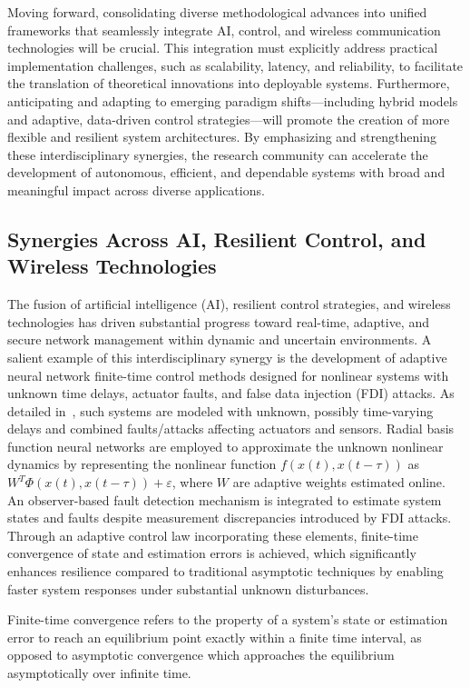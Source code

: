 \documentclass[sigconf]{acmart}
\begin{document}
Moving forward, consolidating diverse methodological advances into unified frameworks that seamlessly integrate AI, control, and wireless communication technologies will be crucial. This integration must explicitly address practical implementation challenges, such as scalability, latency, and reliability, to facilitate the translation of theoretical innovations into deployable systems. Furthermore, anticipating and adapting to emerging paradigm shifts—including hybrid models and adaptive, data-driven control strategies—will promote the creation of more flexible and resilient system architectures. By emphasizing and strengthening these interdisciplinary synergies, the research community can accelerate the development of autonomous, efficient, and dependable systems with broad and meaningful impact across diverse applications.

\subsection{Synergies Across AI, Resilient Control, and Wireless Technologies}

The fusion of artificial intelligence (AI), resilient control strategies, and wireless technologies has driven substantial progress toward real-time, adaptive, and secure network management within dynamic and uncertain environments. A salient example of this interdisciplinary synergy is the development of adaptive neural network finite-time control methods designed for nonlinear systems with unknown time delays, actuator faults, and false data injection (FDI) attacks. As detailed in~\cite{ref46}, such systems are modeled with unknown, possibly time-varying delays and combined faults/attacks affecting actuators and sensors. Radial basis function neural networks are employed to approximate the unknown nonlinear dynamics by representing the nonlinear function $f(x(t), x(t-\tau))$ as $W^T \Phi(x(t), x(t-\tau)) + \varepsilon$, where $W$ are adaptive weights estimated online. An observer-based fault detection mechanism is integrated to estimate system states and faults despite measurement discrepancies introduced by FDI attacks. Through an adaptive control law incorporating these elements, finite-time convergence of state and estimation errors is achieved, which significantly enhances resilience compared to traditional asymptotic techniques by enabling faster system responses under substantial unknown disturbances.

\begin{definition}
Finite-time convergence refers to the property of a system's state or estimation error to reach an equilibrium point exactly within a finite time interval, as opposed to asymptotic convergence which approaches the equilibrium asymptotically over infinite time.
\end{definition}
\end{document}
